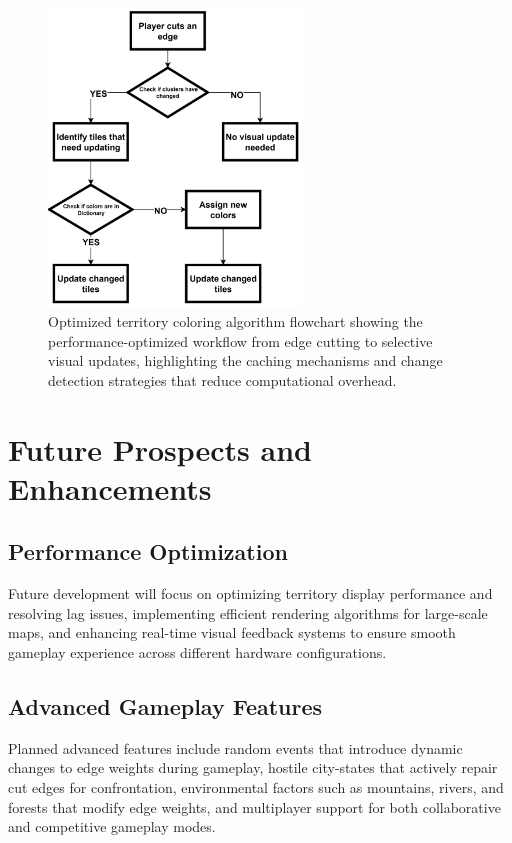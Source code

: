 \documentclass[english]{tudscrreprt}
\begin{document}
\begin{figure}[h]
\centering
\includegraphics[width=0.6\textwidth]{figures/territory_coloring_flowchart.png}
\caption{Optimized territory coloring algorithm flowchart showing the performance-optimized workflow from edge cutting to selective visual updates, highlighting the caching mechanisms and change detection strategies that reduce computational overhead.}
\label{fig:territory_coloring_flowchart}
\end{figure}







\section{Future Prospects and Enhancements}

\subsection{Performance Optimization}
Future development will focus on optimizing territory display performance and resolving lag issues, implementing efficient rendering algorithms for large-scale maps, and enhancing real-time visual feedback systems to ensure smooth gameplay experience across different hardware configurations.

\subsection{Advanced Gameplay Features}
Planned advanced features include random events that introduce dynamic changes to edge weights during gameplay, hostile city-states that actively repair cut edges for confrontation, environmental factors such as mountains, rivers, and forests that modify edge weights, and multiplayer support for both collaborative and competitive gameplay modes.
\end{document}
